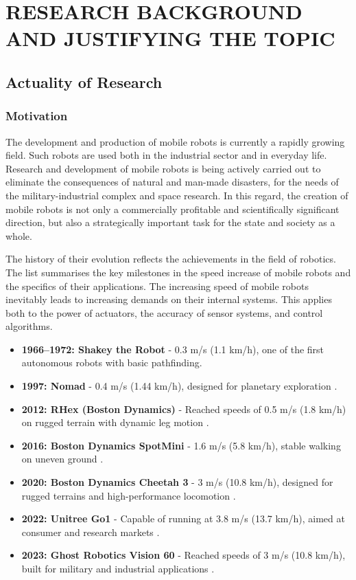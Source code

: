 
\section{RESEARCH BACKGROUND AND JUSTIFYING THE TOPIC}
\subsection{Actuality of Research}
\subsubsection{Motivation}
The development and production of mobile robots is currently a rapidly growing field. Such robots are used both in the industrial sector and in everyday life. Research and development of mobile robots is being actively carried out to eliminate the consequences of natural and man-made disasters, for the needs of the military-industrial complex and space research. In this regard, the creation of mobile robots is not only a commercially profitable and scientifically significant direction, but also a strategically important task for the state and society as a whole.  

The history of their evolution reflects the achievements in the field of robotics. The list summarises the key milestones in the speed increase of mobile robots and the specifics of their applications. The increasing speed of mobile robots inevitably leads to increasing demands on their internal systems. This applies both to the power of actuators, the accuracy of sensor systems, and control algorithms\citep{turn0search0}.

\begin{itemize}
    \item \textbf{1966–1972: Shakey the Robot} - 0.3 m/s (1.1 km/h), one of the first autonomous robots with basic pathfinding.
    \item \textbf{1997: Nomad} - 0.4 m/s (1.44 km/h), designed for planetary exploration \citep{nomad1997}.
    \item \textbf{2012: RHex (Boston Dynamics)} - Reached speeds of 0.5 m/s (1.8 km/h) on rugged terrain with dynamic leg motion \citep{cheetah2012}.
    \item \textbf{2016: Boston Dynamics SpotMini} - 1.6 m/s (5.8 km/h), stable walking on uneven ground \citep{spot2016}.
    \item \textbf{2020: Boston Dynamics Cheetah 3} - 3 m/s (10.8 km/h), designed for rugged terrains and high-performance locomotion \citep{cheetah2012}.
    \item \textbf{2022: Unitree Go1} - Capable of running at 3.8 m/s (13.7 km/h), aimed at consumer and research markets \citep{unitreeGo1}.
    \item \textbf{2023: Ghost Robotics Vision 60} - Reached speeds of 3 m/s (10.8 km/h), built for military and industrial applications \citep{ghostVision60}.
\end{itemize}


